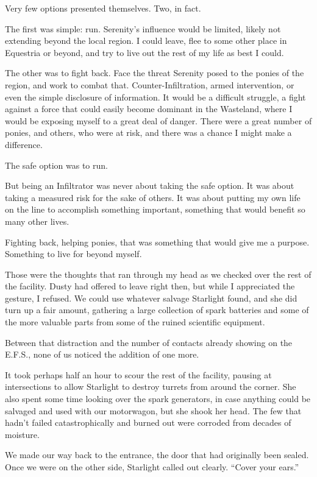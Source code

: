 Very few options presented themselves. Two, in fact.

The first was simple: run. Serenity’s influence would be limited, likely not extending beyond the local region. I could leave, flee to some other place in Equestria or beyond, and try to live out the rest of my life as best I could.

The other was to fight back. Face the threat Serenity posed to the ponies of the region, and work to combat that. Counter-Infiltration, armed intervention, or even the simple disclosure of information. It would be a difficult struggle, a fight against a force that could easily become dominant in the Wasteland, where I would be exposing myself to a great deal of danger. There were a great number of ponies, and others, who were at risk, and there was a chance I might make a difference.

The safe option was to run.

But being an Infiltrator was never about taking the safe option. It was about taking a measured risk for the sake of others. It was about putting my own life on the line to accomplish something important, something that would benefit so many other lives.

Fighting back, helping ponies, that was something that would give me a purpose. Something to live for beyond myself.

Those were the thoughts that ran through my head as we checked over the rest of the facility. Dusty had offered to leave right then, but while I appreciated the gesture, I refused. We could use whatever salvage Starlight found, and she did turn up a fair amount, gathering a large collection of spark batteries and some of the more valuable parts from some of the ruined scientific equipment.

Between that distraction and the number of contacts already showing on the E.F.S., none of us noticed the addition of one more.

It took perhaps half an hour to scour the rest of the facility, pausing at intersections to allow Starlight to destroy turrets from around the corner. She also spent some time looking over the spark generators, in case anything could be salvaged and used with our motorwagon, but she shook her head. The few that hadn’t failed catastrophically and burned out were corroded from decades of moisture.

We made our way back to the entrance, the door that had originally been sealed. Once we were on the other side, Starlight called out clearly. “Cover your ears.”


